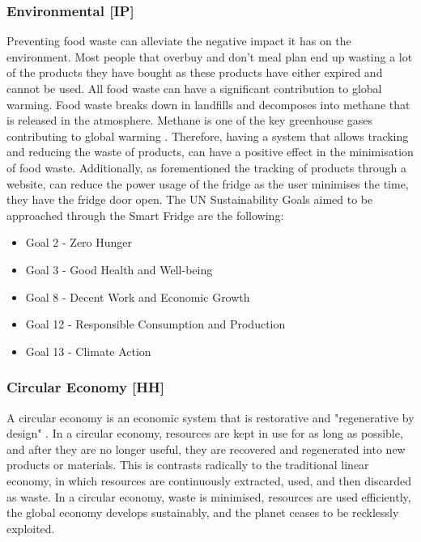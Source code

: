 \subsubsection{Environmental [IP]} 
Preventing food waste can alleviate the negative impact it has on the environment.
Most people that overbuy and don't meal plan end up wasting a lot of the products they have bought as these products have either expired and cannot be used.
All food waste can have a significant contribution to global warming.
Food waste breaks down in landfills and decomposes into methane that is released in the atmosphere.
Methane is one of the key greenhouse gases contributing to global warming \cite{foodwaste}.
Therefore, having a system that allows tracking and reducing the waste of products, can have a positive effect in the minimisation of food waste.
Additionally, as forementioned the tracking of products through a website, can reduce the power usage of the fridge as the user minimises the time, they have the fridge door open.
The UN Sustainability Goals aimed to be approached through the Smart Fridge are the following:

\begin{itemize}
    \item Goal 2 - Zero Hunger
    \item Goal 3 - Good Health and Well-being
    \item Goal 8 - Decent 	Work and Economic Growth
    \item Goal 12 - Responsible Consumption and Production
   \item Goal 13 - Climate Action 
\end{itemize}

\subsubsection{Circular Economy [HH]}

A circular economy is an economic system that is restorative and "regenerative by design" \cite{circ}.
In a circular economy, resources are kept in use for as long as possible, and after they are no longer useful, they are recovered
and regenerated into new products or materials.
This is contrasts radically to the traditional linear economy, in which resources are continuously extracted, used,
and then discarded as waste.
In a circular economy, waste is minimised, resources are used efficiently, the global economy develops sustainably, and the planet ceases to be recklessly exploited.


